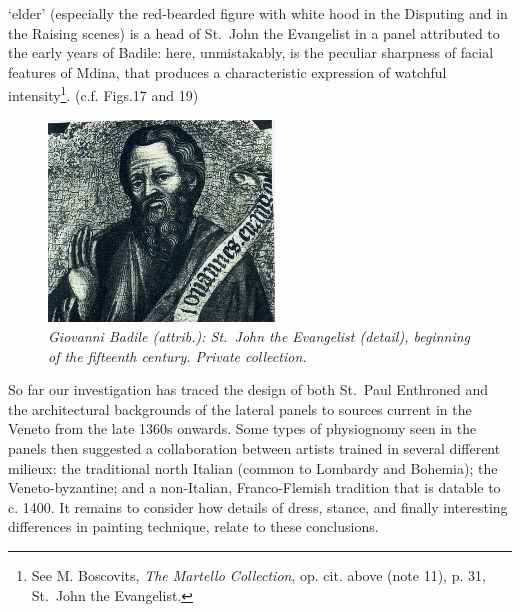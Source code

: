 \documentclass[a4paper,12pt]{article}
\begin{document}
`elder' (especially the red-bearded figure with white hood in the
Disputing and in the Raising scenes) is a head of St.~John the
Evangelist in a panel attributed to the early years of Badile: here,
unmistakably, is the peculiar sharpness of facial features of Mdina,
that produces a characteristic expression of watchful
intensity\footnote{See M. Boscovits, \textit{The Martello Collection},
op. cit. above (note 11), p. 31, St.~John the
Evangelist.}. (c.f. Figs.17 and 19)
\begin{figure}[htbp]
\centering
\includegraphics[width=6cm]{pics/fig19.png}
\caption[Giovanni Badile (attrib.): St.~John the Evangelist,
  beginning of the fifteenth century]
{\it Giovanni Badile (attrib.): St.~John the Evangelist (detail),
  beginning of the fifteenth century.  Private collection.}
\end{figure}

So far our investigation has traced the design of both St.~Paul
Enthroned and the architectural backgrounds of the lateral panels to
sources current in the Veneto from the late 1360s onwards. Some types
of physiognomy seen in the panels then suggested a collaboration
between artists trained in several different milieux: the traditional
north Italian (common to Lombardy and Bohemia); the Veneto-byzantine;
and a non-Italian, Franco-Flemish tradition that is datable to
c. 1400. It remains to consider how details of dress, stance, and
finally interesting differences in painting technique, relate to these
conclusions.
\end{document}
